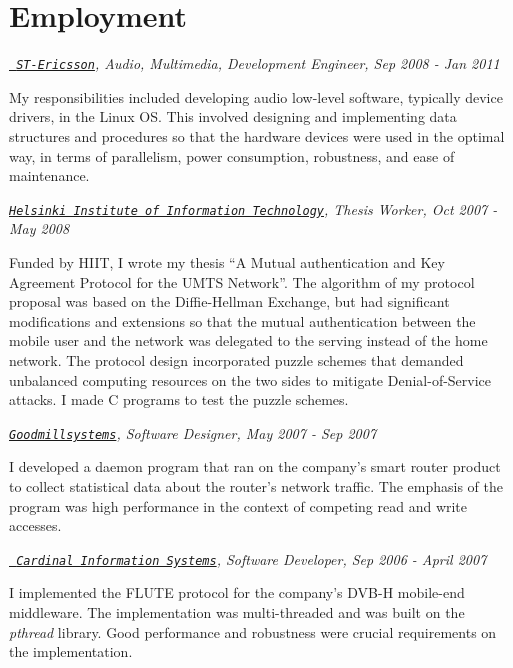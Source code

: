\documentclass[10pt,letterpaper]{article}
\newenvironment{aperiod}{
  \begin{list}{}{
    \setlength{\leftmargin}{1.5em}
    \setlength{\itemsep}{1em}
    \setlength{\parskip}{0pt}
    \setlength{\parsep}{0.25em}
  }
}{
  \end{list}
}
\begin{document}
\section*{Employment}
\begin{aperiod}
\item {\it \href{http://www.stericsson.com}{\tt
      ST-Ericsson}, Audio, Multimedia, Development Engineer, Sep 2008
    - Jan 2011}

  My responsibilities included developing audio low-level software,
  typically device drivers, in the Linux OS. This involved designing and
  implementing data structures and procedures so that the hardware
  devices were used in the optimal way, in terms of parallelism,
  power consumption, robustness, and ease of maintenance.

\item {\it \href{http://www.hiit.fi}{\tt Helsinki
      Institute of Information Technology}, Thesis Worker, Oct 2007 -
    May 2008}

  Funded by HIIT, I wrote my thesis ``A Mutual authentication and Key
  Agreement Protocol for the UMTS Network''. The algorithm of my
  protocol proposal was based on the Diffie-Hellman Exchange, but had
  significant modifications and extensions so that the mutual
  authentication between the mobile user and the network was delegated
  to the serving instead of the home network. The protocol design
  incorporated puzzle schemes that demanded unbalanced computing
  resources on the two sides to mitigate Denial-of-Service attacks. I
  made C programs to test the puzzle schemes.

\item {\it
    \href{http://www.goodmillsystems.com}{\tt Goodmillsystems},
    Software Designer, May 2007 - Sep 2007}

  I developed a daemon program that ran on the company's smart router
  product to collect statistical data about the router's network
  traffic. The emphasis of the program was high performance in the
  context of competing read and write accesses.

\item {\it \href{http://www.cardinal.fi/}{\tt
      Cardinal Information Systems}, Software Developer, Sep 2006 -
    April 2007}

  I implemented the FLUTE protocol for the company's DVB-H
  mobile-end middleware. The implementation was multi-threaded and was
  built on the {\it pthread} library. Good performance and robustness
  were crucial requirements on the implementation.


\end{aperiod}
\end{document}
